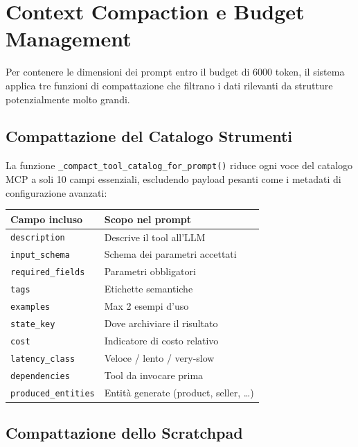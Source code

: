 \section{Context Compaction e Budget Management}
\label{sec:context-compaction}

Per contenere le dimensioni dei prompt entro il budget di 6000 token,
il sistema applica tre funzioni di compattazione che filtrano i dati
rilevanti da strutture potenzialmente molto grandi.

\subsection{Compattazione del Catalogo Strumenti}
\label{subsec:compact-tools}

La funzione \texttt{\_compact\_tool\_catalog\_for\_prompt()} riduce ogni
voce del catalogo MCP a soli 10 campi essenziali, escludendo payload
pesanti come i metadati di configurazione avanzati:

\begin{center}
\begin{tabular}{ll}
\hline
\textbf{Campo incluso} & \textbf{Scopo nel prompt} \\
\hline
\texttt{description} & Descrive il tool all'LLM \\
\texttt{input\_schema} & Schema dei parametri accettati \\
\texttt{required\_fields} & Parametri obbligatori \\
\texttt{tags} & Etichette semantiche \\
\texttt{examples} & Max 2 esempi d'uso \\
\texttt{state\_key} & Dove archiviare il risultato \\
\texttt{cost} & Indicatore di costo relativo \\
\texttt{latency\_class} & Veloce / lento / very-slow \\
\texttt{dependencies} & Tool da invocare prima \\
\texttt{produced\_entities} & Entità generate (product, seller, …) \\
\hline
\end{tabular}
\end{center}

\subsection{Compattazione dello Scratchpad}
\label{subsec:compact-scratchpad}

